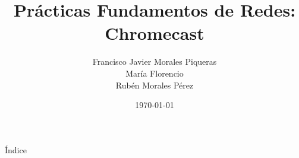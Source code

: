 \documentclass[compress]{beamer}
\title{Prácticas Fundamentos de Redes: \\ Chromecast}
\author{Francisco Javier Morales Piqueras \\
	María Florencio \\
	Rubén Morales Pérez}
\date{\today}
\begin{document}
\begin{frame}
\titlepage
\end{frame}

\begin{frame}{Índice}
  \hypertarget{index}{}
  \tableofcontents
\end{frame}




\end{document}
